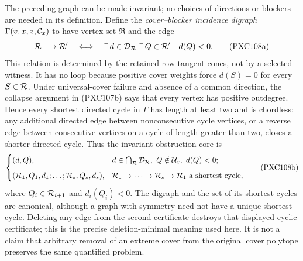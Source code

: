 \documentclass[11pt]{article}
\begin{document}
The preceding graph can be made invariant; no choices of directions or
blockers are needed in its definition.  Define the
\emph{cover--blocker incidence digraph}
\(\Gamma(v,x,z,{\cal C}_x)\) to have vertex set \(\mathfrak R\) and the edge
\begin{equation}
 {\cal R}\longrightarrow{\cal R}'
 \quad\Longleftrightarrow\quad
 \exists\,d\in{\cal D}_{\cal R}\ \exists\,Q\in{\cal R}'
 \quad d(Q)<0.                                                \tag{PXC108a}
\end{equation}
This relation is determined by the retained-row tangent cones, not by a
selected witness.  It has no loop because positive cover weights force
\(d(S)=0\) for every \(S\in{\cal R}\).  Under universal-cover failure and
absence of a common direction, the collapse argument in (PXC107b) says that
every vertex has positive outdegree.  Hence every shortest directed cycle in
\(\Gamma\) has length at least two and is chordless: any additional directed
edge between nonconsecutive cycle vertices, or a reverse edge between
consecutive vertices on a cycle of length greater than two, closes a shorter
directed cycle.  Thus the invariant obstruction core is
\begin{equation}
 \begin{cases}
 (d,Q),&
 d\in\bigcap_{\cal R}{\cal D}_{\cal R},\
 Q\notin{\cal U}_z,\ d(Q)<0;\\[2mm]
 ({\cal R}_1,Q_1,d_1;\ldots;{\cal R}_s,Q_s,d_s),&
 {\cal R}_1\to\cdots\to{\cal R}_s\to{\cal R}_1
 \text{ a shortest cycle},
 \end{cases}                                                 \tag{PXC108b}
\end{equation}
where \(Q_i\in{\cal R}_{i+1}\) and \(d_i(Q_i)<0\).  The digraph and the set
of its shortest cycles are canonical, although a graph with symmetry need
not have a unique shortest cycle.  Deleting any edge from the second
certificate destroys that displayed cyclic certificate; this is the precise
deletion-minimal meaning used here.  It is not a claim that arbitrary removal
of an extreme cover from the original cover polytope preserves the same
quantified problem.
\end{document}
